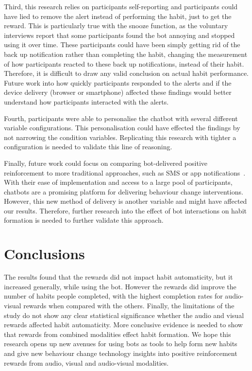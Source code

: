 \documentclass{scaffold/sigchi}
\begin{document}
Third, this research relies on participants self-reporting and participants could have lied to remove the alert instead of performing the habit, just to get the reward. This is particularly true with the snooze function, as the voluntary interviews report that some participants found the bot annoying and stopped using it over time. These participants could have been simply getting rid of the back up notification rather than completing the habit, changing the measurement of how participants reacted to these back up notifications, instead of their habit. Therefore, it is difficult to draw any valid conclusion on actual habit performance. Future work into how quickly participants responded to the alerts and if the device delivery (browser or smartphone) affected these findings would better understand how participants interacted with the alerts.


Fourth, participants were able to personalise the chatbot with several different variable configurations. This personalisation could have effected the findings by not narrowing the condition variables. Replicating this research with tighter a configuration is needed to validate this line of reasoning. 

Finally, future work could focus on comparing bot-delivered positive reinforcement to more traditional approaches, such as SMS or app notifications~\cite{article_beyond_self_tracking_designing_apps}. With their ease of implementation and access to a large pool of participants, chatbots are a promising platform for delivering behaviour change interventions. However, this new method of delivery is another variable and might have affected our results. Therefore, further research into the effect of bot interactions on habit formation is needed to further validate this approach.   

\section{Conclusions}
The results found that the rewards did not impact habit automaticity, but it increased generally, while using the bot. However the rewards did improve the number of habits people completed, with the highest completion rates for audio-visual rewards when compared with the others. Finally, the limitations of the study do not show any clear statistical significance whether the audio and visual rewards affected habit automaticity. More conclusive evidence is needed to show that rewards from combined modalities effect habit formation. We hope this research opens up new avenues for using bots as tools to help form new habits and give new behaviour change technology insights into positive reinforcement rewards from audio, visual and audio-visual modalities.
\end{document}
